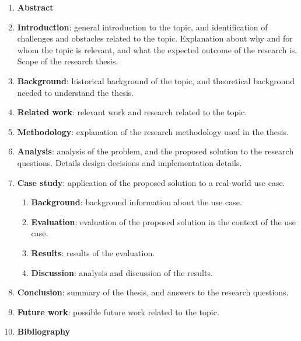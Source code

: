 \documentclass[12pt]{article}
\begin{document}
	\begin{enumerate}
		\item \textbf{Abstract}
		\item \textbf{Introduction}: general introduction to the topic, and identification of challenges and obstacles related to the topic.
		Explanation about why and for whom the topic is relevant, and what the expected outcome of the research is.
		Scope of the research thesis.
		\item \textbf{Background}: historical background of the topic, and theoretical background needed to understand the thesis.
		\item \textbf{Related work}: relevant work and research related to the topic.
		\item \textbf{Methodology}: explanation of the research methodology used in the thesis.
		\item \textbf{Analysis}: analysis of the problem, and the proposed solution to the research questions.
		Details design decisions and implementation details.
		\item \textbf{Case study}: application of the proposed solution to a real-world use case.
			\begin{enumerate}
				\item \textbf{Background}: background information about the use case.
				\item \textbf{Evaluation}: evaluation of the proposed solution in the context of the use case.
				\item \textbf{Results}: results of the evaluation.
				\item \textbf{Discussion}: analysis and discussion of the results.
			\end{enumerate}
		\item \textbf{Conclusion}: summary of the thesis, and answers to the research questions.
		\item \textbf{Future work}: possible future work related to the topic.
		\item \textbf{Bibliography}
	\end{enumerate}

	\clearpage


	\nocite{*}

	\printbibliography[heading=bibintoc]
\end{document}
